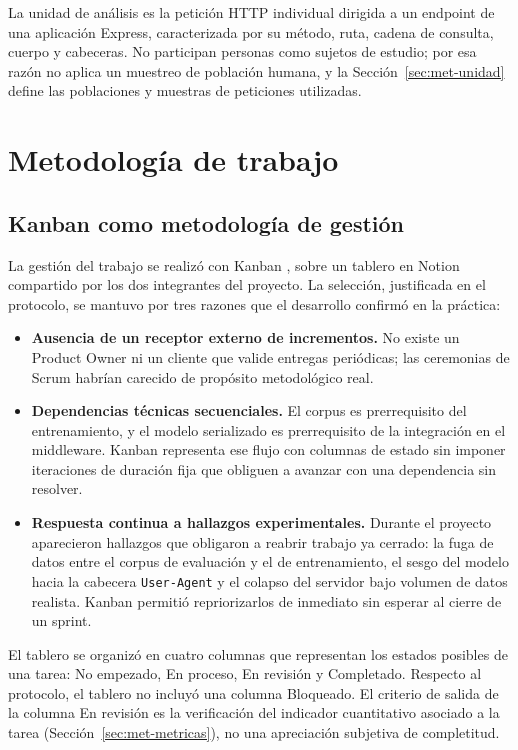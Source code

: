 La unidad de análisis es la petición HTTP individual dirigida a un endpoint de una aplicación
Express, caracterizada por su método, ruta, cadena de consulta, cuerpo y cabeceras. No participan
personas como sujetos de estudio; por esa razón no aplica un muestreo de población humana, y la
Sección~\ref{sec:met-unidad} define las poblaciones y muestras de peticiones utilizadas.

\section{Metodología de trabajo}
\label{sec:met-trabajo}

\subsection{Kanban como metodología de gestión}
La gestión del trabajo se realizó con Kanban \cite{anderson2010}, sobre un tablero en Notion
compartido por los dos integrantes del proyecto. La selección, justificada en el protocolo, se
mantuvo por tres razones que el desarrollo confirmó en la práctica:

\begin{itemize}
    \item \textbf{Ausencia de un receptor externo de incrementos.} No existe un Product Owner
    ni un cliente que valide entregas periódicas; las ceremonias de Scrum habrían carecido de
    propósito metodológico real.
    \item \textbf{Dependencias técnicas secuenciales.} El corpus es prerrequisito del
    entrenamiento, y el modelo serializado es prerrequisito de la integración en el middleware.
    Kanban representa ese flujo con columnas de estado sin imponer iteraciones de duración fija
    que obliguen a avanzar con una dependencia sin resolver.
    \item \textbf{Respuesta continua a hallazgos experimentales.} Durante el proyecto aparecieron
    hallazgos que obligaron a reabrir trabajo ya cerrado: la fuga de datos entre el corpus de
    evaluación y el de entrenamiento, el sesgo del modelo hacia la cabecera \texttt{User-Agent} y
    el colapso del servidor bajo volumen de datos realista. Kanban permitió repriorizarlos de
    inmediato sin esperar al cierre de un sprint.
\end{itemize}

El tablero se organizó en cuatro columnas que representan los estados posibles de una tarea:
No empezado, En proceso, En revisión y Completado. Respecto al protocolo, el tablero no incluyó
una columna Bloqueado. El criterio de salida de la columna En revisión es la verificación del indicador
cuantitativo asociado a la tarea (Sección~\ref{sec:met-metricas}), no una apreciación subjetiva
de completitud.

